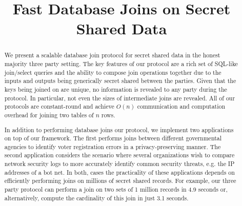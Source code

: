 \documentclass[11pt,letterpaper]{article}
\title{Fast Database Joins on Secret Shared Data}
\begin{document}
\begin{abstract}
We present a scalable database join protocol for secret shared data in the honest majority three party setting. The key features of our protocol are a rich set of SQL-like join/select queries and the ability to compose join operations together due to the inputs and outputs being generically secret shared between the parties. Given that the keys being joined on are unique, no information is revealed to any party during the protocol. In particular, not even the sizes of intermediate joins are revealed. All of our protocols are constant-round and achieve $O(n)$ communication and computation overhead for joining two tables of $n$ rows. 

In addition to performing database joins our protocol, we implement two applications on top of our framework. The first performs joins between different governmental agencies to identify voter registration errors in a privacy-preserving manner. The second application considers the scenario where several organizations wish to compare network security logs to more accurately identify common security threats, e.g. the IP addresses of a bot net. In both, cases the practicality of these applications depends on efficiently performing joins on millions of secret shared records. For example, our three party protocol can perform a join on two sets of 1 million records in 4.9 seconds or, alternatively, compute the cardinality of this join in just 3.1 seconds. 
\end{abstract}

\maketitle



















\appendix


\end{document}
